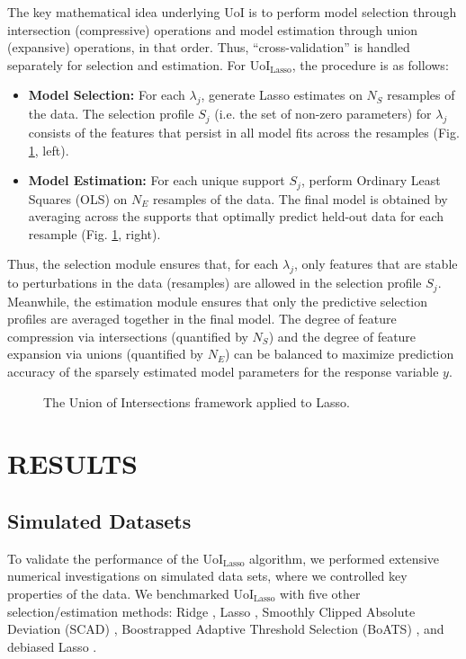 \documentclass[letterpaper, 10 pt, conference]{ieeeconf}  %
\begin{document}
The key mathematical idea underlying UoI is to perform
model selection through intersection (compressive) operations and model estimation through union (expansive) operations, in that order. Thus, ``cross-validation'' is handled separately for selection and estimation. For UoI$_{\text{Lasso}}$, the procedure is as follows:
\begin{itemize}
    \item \textbf{Model Selection:} For each $\lambda_j$, generate Lasso estimates on $N_S$ resamples of the data. The selection profile $S_j$ (i.e. the set of non-zero parameters) for $\lambda_j$ consists of the features that persist in all model fits across the resamples (Fig. \ref{fig:uoi}, left).
    \item \textbf{Model Estimation:} For each unique support $S_j$, perform Ordinary Least Squares (OLS) on $N_E$ resamples of the data. The final model is obtained by averaging across the supports that optimally predict held-out data for each resample (Fig. \ref{fig:uoi}, right). 
\end{itemize}
Thus, the selection module ensures that, for each $\lambda_j$, only features that are stable to perturbations in the data (resamples) are allowed in the selection profile $S_j$. Meanwhile, the estimation module ensures that only the predictive selection profiles are averaged together in the final model. The degree of feature compression via intersections (quantified by $N_S$) and the degree of feature expansion via unions (quantified by $N_E$) can be balanced to maximize prediction accuracy of the sparsely estimated model parameters for the response variable $y$.
\begin{figure}[b]
    \centering
    \caption{The Union of Intersections framework applied to Lasso.}
    \label{fig:uoi}
\end{figure}
\section{RESULTS}
\subsection{Simulated Datasets}
To validate the performance of the UoI$_{\text{Lasso}}$ algorithm, we performed extensive numerical investigations on simulated data sets, where we controlled key properties of the data. We benchmarked UoI$_{\text{Lasso}}$ with five other selection/estimation methods: Ridge \cite{elements}, Lasso \cite{lasso}, Smoothly Clipped Absolute Deviation (SCAD) \cite{scad}, Boostrapped Adaptive Threshold Selection (BoATS) \cite{boats}, and debiased Lasso \cite{dbLasso}. 
\end{document}
